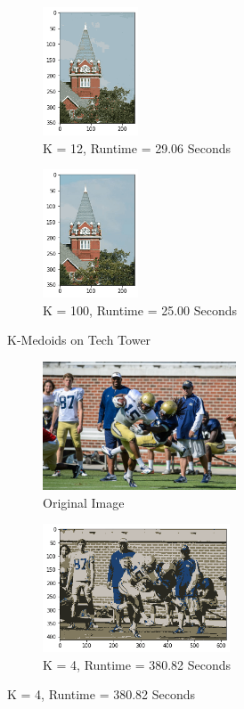 \documentclass[twoside,10pt]{article}
\begin{document}
\begin{enumerate}
\begin{itemize}
\begin{itemize}
\begin{figure}
\begin{subfigure}{.5\textwidth}
  \centering
  \includegraphics[height=1.5in]{Images/TechTowerKMedoids12.png}  
  \caption{K = 12, Runtime = 29.06 Seconds}
  \label{fig:sub-third}
\end{subfigure}
\begin{subfigure}{.5\textwidth}
  \centering
  \includegraphics[height=1.5in]{Images/TechTowerKMedoids100.png}  
  \caption{K = 100, Runtime = 25.00 Seconds}
  \label{fig:sub-fourth}
\end{subfigure}
\caption{K-Medoids on Tech Tower}
\label{fig:fig}
\end{figure}  

\begin{figure}
\begin{subfigure}{.5\textwidth}
  \centering
  \includegraphics[height=1.5in]{Images/football.png}  
  \caption{Original Image}
  \label{fig:sub-first}
\end{subfigure}
\begin{subfigure}{.5\textwidth}
  \centering
  \includegraphics[height=1.5in]{Images/footballkmedoids4.png}  
  \caption{K = 4, Runtime = 380.82 Seconds}
  \label{fig:sub-second}
\end{subfigure}


\end{figure}
\end{itemize}
\end{itemize}
\end{enumerate}
\end{document}
